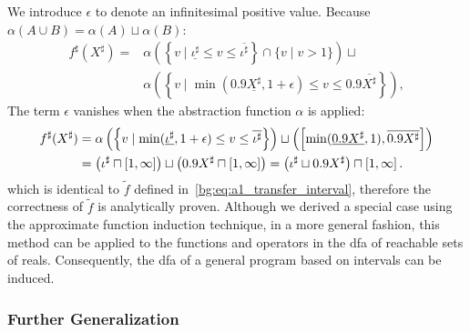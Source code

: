 We introduce $\epsilon$ to denote an infinitesimal positive value.  Because
$\alpha(A \cup B) = \alpha(A) \sqcup \alpha(B)$:
\begin{equation}
    \begin{aligned}
        f^\sharp(X^\sharp)
        ={} & \alpha \left( \left\{
            v \mid \underline{\iota^\sharp}
                \leq v \leq \overline{\iota^\sharp}
        \right\} \cap \{ v \mid v > 1 \} \right) \sqcup \\
        &
        \alpha \left( \left\{
            v \mid
            \min(0.9 \underline{X^\sharp}, 1 + \epsilon)
                \leq v \leq 0.9 \overline{X^\sharp}
        \right\} \right),
    \end{aligned}
\end{equation}
The term $\epsilon$ vanishes when the abstraction function $\alpha$ is applied:
\begin{equation}
    \begin{aligned}
        f^\sharp(X^\sharp)
        &= \alpha \left( \left\{
            v \mid
            \min(\underline{\iota^\sharp}, 1 + \epsilon)
                \leq v \leq \overline{\iota^\sharp}
        \right\} \right) \sqcup
        \left( \left[{
            \min(\underline{0.9X^\sharp}, 1)
          }, {
            \overline{0.9X^\sharp}
          }\right]
        \right) \\
        &= \left( \iota^\sharp \sqcap \left[{1}, {\infty}\right] \right) \sqcup
           \left( 0.9 X^\sharp \sqcap \left[{1}, {\infty}\right] \right)
         = \left( \iota^\sharp \sqcup 0.9 X^\sharp \right) \sqcap
           \left[{1}, {\infty}\right].
    \end{aligned}
\end{equation}
which is identical to $\tilde{f}$ defined
in~\eqref{bg:eq:a1_transfer_interval}, therefore the correctness of $\tilde{f}$
is analytically proven.  Although we derived a special case using the
approximate function induction technique, in a more general fashion, this
method can be applied to the functions and operators in the \gls{dfa} of
reachable sets of reals.  Consequently, the \gls{dfa} of a general program
based on intervals can be induced.

\subsubsection{Further Generalization}

